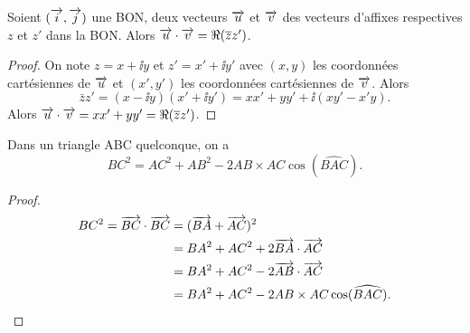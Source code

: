\begin{prop}
  Soient \((\overrightarrow{i},\overrightarrow{j})\) une BON, deux vecteurs \(\overrightarrow{u}\) et \(\overrightarrow{v}\) des vecteurs d'affixes respectives \(z\) et \(z'\) dans la BON\@. Alors \(\overrightarrow{u} \cdot \overrightarrow{v}=\Re(\overline{z} z')\).
\end{prop}
\begin{proof}
  On note \(z=x+\ii y\) et \(z'=x'+\ii y'\) avec \((x,y)\) les coordonnées cartésiennes de \(\overrightarrow{u}\) et \((x',y')\) les coordonnées cartésiennes de \(\overrightarrow{v}\). Alors
  \begin{equation}
    \bar{z} z' = (x-\ii y)(x'+\ii y')=xx'+yy' + \ii(xy'-x'y).
  \end{equation}
  Alors \(\overrightarrow{u} \cdot \overrightarrow{v}=xx' + yy'=\Re(\overline{z} z')\).
\end{proof}
\begin{prop}
  Dans un triangle ABC quelconque, on a 
  \begin{equation}
    BC^2=AC^2+AB^2-2 AB \times AC \cos(\widehat{BAC}).
  \end{equation}
\end{prop}
\begin{proof}
  \begin{align}
    BC^2=\overrightarrow{BC} \cdot \overrightarrow{BC}& =(\overrightarrow{BA}+\overrightarrow{AC})^2 \\
    & = BA^2+AC^2 +2 \overrightarrow{BA} \cdot \overrightarrow{AC} \\ 
    & = BA^2+AC^2 -2 \overrightarrow{AB} \cdot \overrightarrow{AC}\\ 
    & = BA^2+AC^2 -2 AB \times AC \cos(\widehat{BAC}).
  \end{align}
\end{proof}

